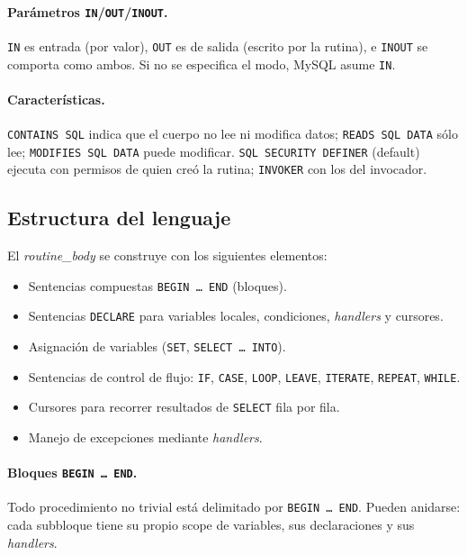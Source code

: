 \documentclass[11pt,a4paper]{article}
\begin{document}
\paragraph{Parámetros \texttt{IN}/\texttt{OUT}/\texttt{INOUT}.}
\texttt{IN} es entrada (por valor), \texttt{OUT} es de salida
(escrito por la rutina), e \texttt{INOUT} se comporta como ambos.
Si no se especifica el modo, MySQL asume \texttt{IN}.

\paragraph{Características.} \texttt{CONTAINS SQL} indica que el
cuerpo no lee ni modifica datos; \texttt{READS SQL DATA} sólo lee;
\texttt{MODIFIES SQL DATA} puede modificar. \texttt{SQL SECURITY
DEFINER} (default) ejecuta con permisos de quien creó la rutina;
\texttt{INVOKER} con los del invocador.

\subsection{Estructura del lenguaje}

El \emph{routine\_body} se construye con los siguientes elementos:

\begin{itemize}
    \item Sentencias compuestas \texttt{BEGIN \dots\ END} (bloques).
    \item Sentencias \texttt{DECLARE} para variables locales,
    condiciones, \emph{handlers} y cursores.
    \item Asignación de variables (\texttt{SET}, \texttt{SELECT \dots\
    INTO}).
    \item Sentencias de control de flujo: \texttt{IF}, \texttt{CASE},
    \texttt{LOOP}, \texttt{LEAVE}, \texttt{ITERATE}, \texttt{REPEAT},
    \texttt{WHILE}.
    \item Cursores para recorrer resultados de \texttt{SELECT} fila
    por fila.
    \item Manejo de excepciones mediante \emph{handlers}.
\end{itemize}

\paragraph{Bloques \texttt{BEGIN \dots\ END}.} Todo procedimiento no
trivial está delimitado por \texttt{BEGIN \dots\ END}. Pueden
anidarse: cada subbloque tiene su propio scope de variables, sus
declaraciones y sus \emph{handlers}.
\end{document}
